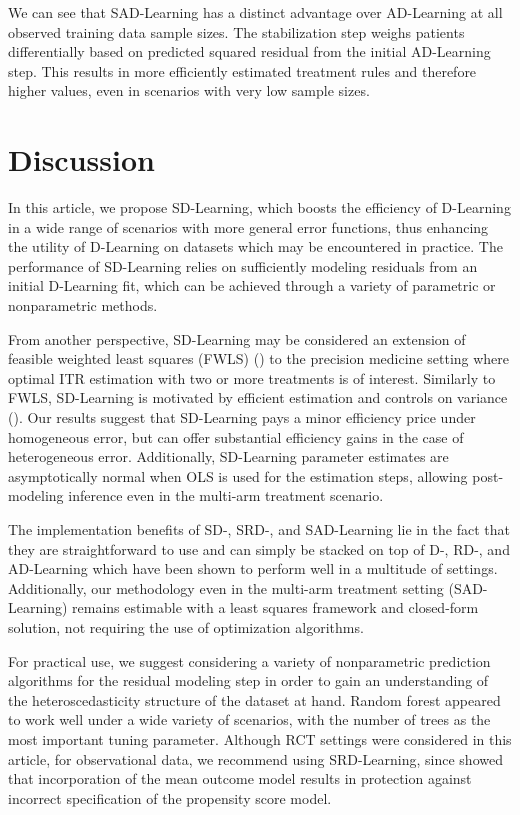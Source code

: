 \documentclass[useAMS,usenatbib]{biom}
\begin{document}
We can see that SAD-Learning has a distinct advantage over AD-Learning at all observed training data sample sizes. The stabilization step weighs patients differentially based on predicted squared residual from the initial AD-Learning step. This results in more efficiently estimated treatment rules and therefore higher values, even in scenarios with very low sample sizes.

\section{Discussion} \label{sec_discussion}

In this article, we propose SD-Learning, which boosts the efficiency of D-Learning in a wide range of scenarios with more general error functions, thus enhancing the utility of D-Learning on datasets which may be encountered in practice. The performance of SD-Learning relies on sufficiently modeling residuals from an initial D-Learning fit, which can be achieved through a variety of parametric or nonparametric methods. 

From another perspective, SD-Learning may be considered an extension of feasible weighted least squares (FWLS) (\cite{olive_wls_2017}) to the precision medicine setting where optimal ITR estimation with two or more treatments is of interest. Similarly to FWLS, SD-Learning is motivated by efficient estimation and controls on variance (\cite{miller_feasible_2018}). Our results suggest that SD-Learning pays a minor efficiency price under homogeneous error, but can offer substantial efficiency gains in the case of heterogeneous error. Additionally, SD-Learning parameter estimates are asymptotically normal when OLS is used for the estimation steps, allowing post-modeling inference even in the multi-arm treatment scenario. 

The implementation benefits of SD-, SRD-, and SAD-Learning lie in the fact that they are straightforward to use and can simply be stacked on top of D-, RD-, and AD-Learning which have been shown to perform well in a multitude of settings. Additionally, our methodology even in the multi-arm treatment setting (SAD-Learning) remains estimable with a least squares framework and closed-form solution, not requiring the use of optimization algorithms.

For practical use, we suggest considering a variety of nonparametric prediction algorithms for the residual modeling step in order to gain an understanding of the heteroscedasticity structure of the dataset at hand. Random forest appeared to work well under a wide variety of scenarios, with the number of trees as the most important tuning parameter. Although RCT settings were considered in this article, for observational data, we recommend using SRD-Learning, since \cite{meng_doubly_2021} showed that incorporation of the mean outcome model results in protection against incorrect specification of the propensity score model. 
\end{document}
